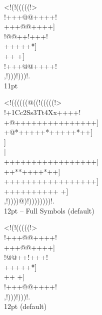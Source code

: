 \documentclass[12pt]{article}
\begin{document}
\begin{center}
{
\gnos%
<!(!(((((!>\\
!+++@@++++!\\
+++@@++++]\\
!@@++!+++!\\
+++++*]\\
++
+]\\
!+++@@++++!\\
,!)))!)))!.\\
}
11pt

{
{
\gnos%
<!((((((@((!(((((!>\\
!+1Cc2Ss3Tt4Xx++++!\\
+@+++++++++++++++]\\
+@*+++++*+++++*++]\\}
{\gnosb{}}{\gnos]\\}
{\gnosw{}}{\gnos]\\
+++++++++++++++++]\\
++*{\gnoswi{}}{\gnoswii{}}{\gnoswiii{}}{\gnosbi{}}{\gnosbii{}}{\gnosbiii{}}*++++*++]\\
+++++++++++++++++]\\
++++++++++
+]\\
,!))))@)!))))))))!.\\
}}
12pt -- Full Symbols (default)

{
\gnos%
<!(!(((((!>\\
!+++@@++++!\\
+++@@++++]\\
!@@++!+++!\\
+++++*]\\
++
+]\\
!+++@@++++!\\
,!)))!)))!.\\
}
12pt (default)


\end{center}
\end{document}

